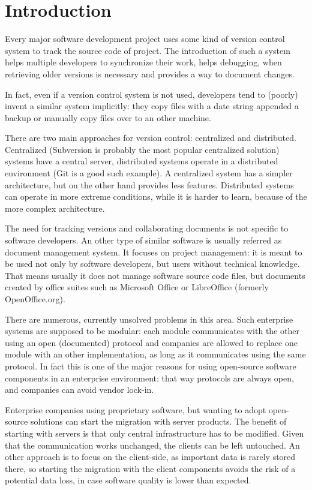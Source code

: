 \section{Introduction}

Every major software development project uses some kind of version control
system to track the source code of project. The introduction of such a system
helps multiple developers to synchronize their work, helps debugging, when
retrieving older versions is necessary and provides a way to document changes.

In fact, even if a version control system is not used, developers tend to
(poorly) invent a similar system implicitly: they copy files with a date string
appended a backup or manually copy files over to an other machine.

There are two main approaches for version control: centralized and distributed.
Centralized (Subversion\cite{subversion} is probably the most
popular centralized solution) systems have a central server, distributed
systems operate in a distributed environment (Git\cite{git} is a good such
example). A centralized system has a simpler architecture, but on the other
hand provides less features. Distributed systems can operate in more extreme
conditions, while it is harder to learn, because of the more complex
architecture.

The need for tracking versions and collaborating documents is not specific to
software developers. An other type of similar software is usually referred as
document management system. It focuses on project management: it is meant to be
used  not only by software developers, but users without technical knowledge.
That means usually it does not manage software source code files, but documents
created by office suites such as Microsoft Office\cite{mso} or
LibreOffice\cite{lo} (formerly OpenOffice.org\cite{ooo}).

There are numerous, currently unsolved problems in this area. Such enterprise
systems are supposed to be modular: each module communicates with the other
using an open (documented) protocol and companies are allowed to replace one
module with an other implementation, as long as it communicates using the same
protocol. In fact this is one of the major reasons for using open-source
software components in an enterprise environment: that way protocols are always
open, and companies can avoid vendor lock-in.

Enterprise companies using proprietary software, but wanting to adopt
open-source solutions can start the migration with server products. The benefit
of starting with servers is that only central infrastructure has to be
modified. Given that the communication works unchanged, the clients can be left
untouched. An other approach is to focus on the client-side, as important data
is rarely stored there, so starting the migration with the client components
avoids the risk of a potential data loss, in case software quality is lower
than expected.

